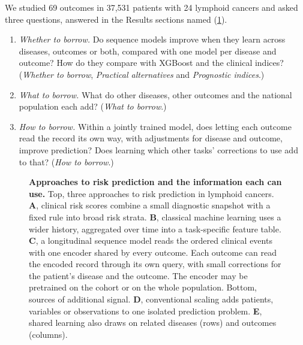 We studied 69 outcomes in 37,531 patients with 24 lymphoid cancers and asked
three questions, answered in the Results sections named
(\cref{fig:paradigms}).
\begin{enumerate}[leftmargin=1.5em,itemsep=2pt,topsep=3pt]
  \item \emph{Whether to borrow.} Do sequence models improve when they learn
  across diseases, outcomes or both, compared with one model per disease and
  outcome? How do they compare with XGBoost and the clinical indices?
  (\emph{Whether to borrow}, \emph{Practical alternatives} and
  \emph{Prognostic indices}.)
  \item \emph{What to borrow.} What do other diseases, other outcomes and the
  national population each add? (\emph{What to borrow}.)
  \item \emph{How to borrow.} Within a jointly trained model, does letting each
  outcome read the record its own way, with adjustments for disease and outcome,
  improve prediction? Does learning which other tasks' corrections to use add
  to that? (\emph{How to borrow}.)
\end{enumerate}

\begin{figure}[H]
  \centering
  \resizebox{\textwidth}{!}{}\par\vspace{3mm}
  \resizebox{\textwidth}{!}{}
  \caption{\textbf{Approaches to risk prediction and the information each
  can use.} Top, three approaches to risk prediction in lymphoid cancers.
  \textbf{A}, clinical risk scores combine a small diagnostic snapshot with a
  fixed rule into broad risk strata. \textbf{B}, classical machine learning
  uses a wider history, aggregated over time into a task-specific feature
  table. \textbf{C}, a longitudinal sequence model reads the ordered clinical
  events with one encoder shared by every outcome. Each outcome can read the
  encoded record through its own query, with small corrections for the
  patient's disease and the outcome. The encoder may be pretrained on the
  cohort or on the whole population. Bottom,
  sources of additional signal. \textbf{D}, conventional scaling adds patients,
  variables or observations to one isolated prediction problem. \textbf{E},
  shared learning also draws on related diseases (rows) and outcomes
  (columns).}
  \label{fig:paradigms}
\end{figure}

\clearpage
{}

